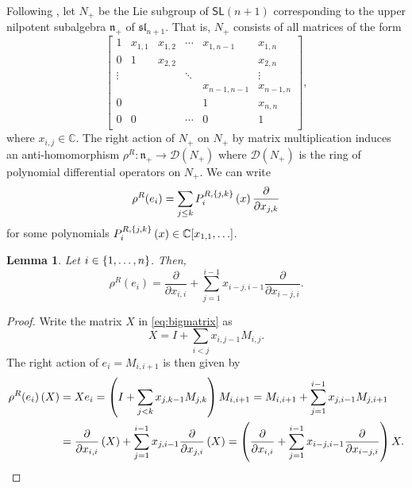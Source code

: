 \documentclass[10pt,a4paper]{amsart}
\numberwithin{equation}{section}
\newcommand{\pd}{\partial}     %
\DeclarePairedDelimiter{\sqbrac}{\lbrack}{\rbrack} %
\DeclarePairedDelimiter{\set}{\lbrace}{\rbrace}
\newcommand{\fld}[1]{\mathbb{#1}}    %
\newcommand{\alg}[1]{\mathfrak{#1}}  %
\newcommand{\grp}[1]{\mathsf{#1}}    %
\newcommand{\CC}{\fld{C}}
\newcommand{\SLA}[2]{\alg{#1}_{#2}}                      %
\newcommand{\slnpone}{\SLA{sl}{n+1}}
\newcommand{\prvec}[1]{e_{#1}}                                        %
\theoremstyle{plain}
\newtheorem{lemma}[theorem]{Lemma}
\begin{document}
Following \cite{Fre05Opers}, let $N_+$ be the Lie subgroup of $\grp{SL}(n+1)$ corresponding to the upper nilpotent subalgebra $\mathfrak{n}_+$ of $\slnpone$. That is, $N_+$ consists of all matrices of the form
%
\begin{equation} \label{eq:bigmatrix}
\begin{bmatrix}
    1 & x_{1,1} & x_{1,2} & \cdots & x_{1,n-1} & x_{1,n}\\
    0 & 1 & x_{2,2} & & & x_{2,n} \\
    \vdots& & & \ddots & & \vdots \\
    & & & &  x_{n-1,n-1} & x_{n-1,n} \\
    0 &  & & &   1 & x_{n,n}  \\
    0 & 0  &   & \cdots &  0 & 1 \\
\end{bmatrix},
\end{equation}
%
where $x_{i,j} \in \CC$. The right action of $N_+$ on $N_+$ by matrix multiplication induces an anti-homomorphism $\rho^R: \mathfrak{n}_+ \rightarrow \mathcal{D}(N_+)$ where $\mathcal{D}(N_+)$ is the ring of polynomial differential operators on $N_+$. We can write  \cite[Sec.~1.5]{Fre05Opers}
%
\begin{equation} \label{eq:PFunctions}
    \rho^R(\prvec{i}) =\sum_{j\leq k} P^{R,\set{j,k}}_{i} \left(x\right) \frac{\pd}{\pd x_{j,k}}
\end{equation}
%
for some polynomials $P^{R,\set{j,k}}_{i} \left(x\right) \in \CC \sqbrac{x_{1,1},\dots}$. 
%
\begin{lemma}\label{lem:WakScreeners}
Let $i \in \set{1,\dots,n}$. Then,
%
\begin{equation}
    \rho^R(\prvec{i}) = \frac{\pd}{\pd x_{i,i}} + \sum_{j=1}^{i-1} x_{i-j,i-1} \frac{\pd}{\pd x_{i-j,i}}.
\end{equation}
%
\end{lemma}
\begin{proof}
Write the matrix $X$ in \eqref{eq:bigmatrix} as 
%
\begin{equation}
    X = I + \sum_{i<j} x_{i,j-1} M_{i,j}.
\end{equation}
%
The right action of $\prvec{i}=M_{i,i+1}$ is then given by
%
\begin{align}
    \rho^R(\prvec{i}) \left( X \right) &= X \prvec{i} = \left( I + \sum_{j<k} x_{j,k-1} M_{j,k} \right) M_{i,i+1} = M_{i,i+1} + \sum_{j=1}^{i-1} x_{j,i-1} M_{j,i+1} \\
    &= \frac{\pd}{\pd x_{i,i}} \left( X \right) + \sum_{j=1}^{i-1} x_{j,i-1} \frac{\pd}{\pd x_{j,i}} \left( X \right ) = \left(\frac{\pd}{\pd x_{i,i}} + \sum_{j=1}^{i-1} x_{i-j,i-1} \frac{\pd}{\pd x_{i-j,i}} \right) X. \notag \qedhere
\end{align}
%
\end{proof}
\end{document}
